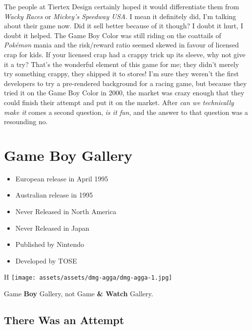 \documentclass{book}
\begin{document}
The people at Tiertex Design certainly hoped it would differentiate them from \emph{Wacky Races} or \emph{Mickey’s Speedway USA}. I mean it definitely did, I’m talking about their game now. Did it sell better because of it though? I doubt it hurt, I doubt it helped. The Game Boy Color was still riding on the coattails of \emph{Pokémon} mania and the risk/reward ratio seemed skewed in favour of licensed crap for kids. If your licensed crap had a crappy trick up its sleeve, why not give it a try? That’s the wonderful element of this game for me; they didn’t merely try something crappy, they shipped it to stores! I’m sure they weren’t the first developers to try a pre-rendered background for a racing game, but because they tried it on the Game Boy Color in 2000, the market was crazy enough that they could finish their attempt and put it on the market. After \emph{can we technically make it} comes a second question, \emph{is it fun}, and the answer to that question was a resounding no.


\begingroup \chapter*{Game Boy Gallery} \endgroup

\begin{itemize} \setlength\itemsep{-0.4em}
\item European release in April 1995
\item Australian release in 1995
\item Never Released in North America
\item Never Released in Japan
\item Published by Nintendo
\item Developed by TOSE
\end{itemize}\noindent

\begin{wrapfigure}{H}{\linewidth}
\vskip 4pt
\centering \texttt{[image: assets/assets/dmg-agga/dmg-agga-1.jpg]}\par\pagetwodescription Game \textbf{Boy} Gallery, not Game \textbf{\& Watch} Gallery.\end{wrapfigure}
\clearpage

\FloatBarrier\needspace{10mm}\section*{There Was an Attempt}\nopagebreak[4]
\end{document}
